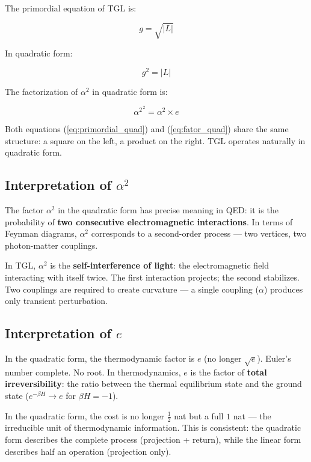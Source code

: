 \documentclass[12pt,a4paper,twoside]{article}
\newcommand{\alphaii}{\alpha^{2}}
\begin{document}
The primordial equation of TGL is:

\begin{equation}
g = \sqrt{|L|}
\end{equation}

In quadratic form:

\begin{equation}
g^2 = |L|
\label{eq:primordial_quad}
\end{equation}

The factorization of $\alphaii$ in quadratic form is:

\begin{equation}
\alphaii^{\,2} = \alpha^2 \times e
\label{eq:fator_quad}
\end{equation}

Both equations (\ref{eq:primordial_quad}) and (\ref{eq:fator_quad}) share the same structure: a square on the left, a product on the right. TGL operates naturally in quadratic form.

\subsection{Interpretation of $\alpha^2$}

The factor $\alpha^2$ in the quadratic form has precise meaning in QED: it is the probability of \textbf{two consecutive electromagnetic interactions}. In terms of Feynman diagrams, $\alpha^2$ corresponds to a second-order process --- two vertices, two photon-matter couplings.

In TGL, $\alpha^2$ is the \textbf{self-interference of light}: the electromagnetic field interacting with itself twice. The first interaction projects; the second stabilizes. Two couplings are required to create curvature --- a single coupling ($\alpha$) produces only transient perturbation.

\subsection{Interpretation of $e$}

In the quadratic form, the thermodynamic factor is $e$ (no longer $\sqrt{e}$). Euler's number complete. No root. In thermodynamics, $e$ is the factor of \textbf{total irreversibility}: the ratio between the thermal equilibrium state and the ground state ($e^{-\beta H} \to e$ for $\beta H = -1$).

In the quadratic form, the cost is no longer $\frac{1}{2}$ nat but a full $1$ nat --- the irreducible unit of thermodynamic information. This is consistent: the quadratic form describes the complete process (projection + return), while the linear form describes half an operation (projection only).
\end{document}

